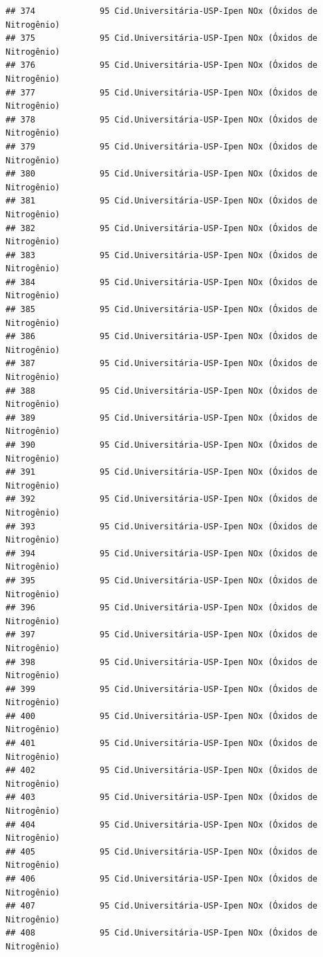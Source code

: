\documentclass[]{book}
\begin{document}
\begin{verbatim}
## 374             95 Cid.Universitária-USP-Ipen NOx (Óxidos de Nitrogênio)
## 375             95 Cid.Universitária-USP-Ipen NOx (Óxidos de Nitrogênio)
## 376             95 Cid.Universitária-USP-Ipen NOx (Óxidos de Nitrogênio)
## 377             95 Cid.Universitária-USP-Ipen NOx (Óxidos de Nitrogênio)
## 378             95 Cid.Universitária-USP-Ipen NOx (Óxidos de Nitrogênio)
## 379             95 Cid.Universitária-USP-Ipen NOx (Óxidos de Nitrogênio)
## 380             95 Cid.Universitária-USP-Ipen NOx (Óxidos de Nitrogênio)
## 381             95 Cid.Universitária-USP-Ipen NOx (Óxidos de Nitrogênio)
## 382             95 Cid.Universitária-USP-Ipen NOx (Óxidos de Nitrogênio)
## 383             95 Cid.Universitária-USP-Ipen NOx (Óxidos de Nitrogênio)
## 384             95 Cid.Universitária-USP-Ipen NOx (Óxidos de Nitrogênio)
## 385             95 Cid.Universitária-USP-Ipen NOx (Óxidos de Nitrogênio)
## 386             95 Cid.Universitária-USP-Ipen NOx (Óxidos de Nitrogênio)
## 387             95 Cid.Universitária-USP-Ipen NOx (Óxidos de Nitrogênio)
## 388             95 Cid.Universitária-USP-Ipen NOx (Óxidos de Nitrogênio)
## 389             95 Cid.Universitária-USP-Ipen NOx (Óxidos de Nitrogênio)
## 390             95 Cid.Universitária-USP-Ipen NOx (Óxidos de Nitrogênio)
## 391             95 Cid.Universitária-USP-Ipen NOx (Óxidos de Nitrogênio)
## 392             95 Cid.Universitária-USP-Ipen NOx (Óxidos de Nitrogênio)
## 393             95 Cid.Universitária-USP-Ipen NOx (Óxidos de Nitrogênio)
## 394             95 Cid.Universitária-USP-Ipen NOx (Óxidos de Nitrogênio)
## 395             95 Cid.Universitária-USP-Ipen NOx (Óxidos de Nitrogênio)
## 396             95 Cid.Universitária-USP-Ipen NOx (Óxidos de Nitrogênio)
## 397             95 Cid.Universitária-USP-Ipen NOx (Óxidos de Nitrogênio)
## 398             95 Cid.Universitária-USP-Ipen NOx (Óxidos de Nitrogênio)
## 399             95 Cid.Universitária-USP-Ipen NOx (Óxidos de Nitrogênio)
## 400             95 Cid.Universitária-USP-Ipen NOx (Óxidos de Nitrogênio)
## 401             95 Cid.Universitária-USP-Ipen NOx (Óxidos de Nitrogênio)
## 402             95 Cid.Universitária-USP-Ipen NOx (Óxidos de Nitrogênio)
## 403             95 Cid.Universitária-USP-Ipen NOx (Óxidos de Nitrogênio)
## 404             95 Cid.Universitária-USP-Ipen NOx (Óxidos de Nitrogênio)
## 405             95 Cid.Universitária-USP-Ipen NOx (Óxidos de Nitrogênio)
## 406             95 Cid.Universitária-USP-Ipen NOx (Óxidos de Nitrogênio)
## 407             95 Cid.Universitária-USP-Ipen NOx (Óxidos de Nitrogênio)
## 408             95 Cid.Universitária-USP-Ipen NOx (Óxidos de Nitrogênio)

\end{verbatim}
\end{document}
